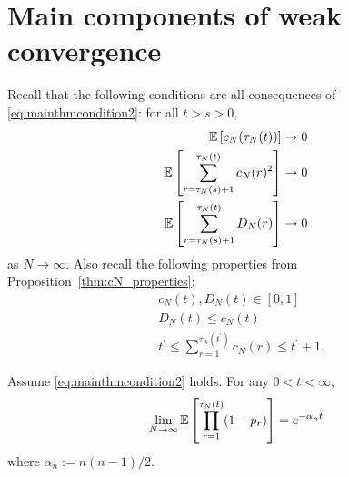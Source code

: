 \section{Main components of weak convergence \seb{$\checkmark$} }
Recall that the following conditions are all consequences of \eqref{eq:mainthmcondition2}: for all $t>s>0$,
\begin{align}
\mathbb{E} \left[ c_N(\tau_N(t)) \right] &\rightarrow 0 \label{eq:BJJK_eq3.3}\\
\mathbb{E}\left[ \sum_{r=\tau_N(s)+1}^{\tau_N(t)} c_N(r)^2 \right] &\rightarrow 0
        \label{eq:BJJK_eq3.5}\\
\mathbb{E}\left[ \sum_{r=\tau_N(s)+1}^{\tau_N(t)} D_N(r) \right] &\rightarrow 0
        \label{eq:BJJK_eq3.4}
\end{align}
as $N\to\infty$.
Also recall the following properties from Proposition~\ref{thm:cN_properties}:
\begin{align}
& c_N(t) , D_N(t) \in [0,1] \label{eq:cN_property1}\\
& D_N(t) \leq c_N(t) \label{eq:cN_property2}\\
& t^\prime
    \leq \sum_{r=1}^{\tau_N(t^\prime)} c_N(r) 
    \leq t^\prime +1 .\label{eq:cN_property4}
\end{align}


\begin{lemma}\label{thm:basis}
Assume \eqref{eq:mainthmcondition2} holds.
For any $0 < t < \infty$,
\begin{equation*}
\lim_{N\to\infty} \mathbb{E}\left[ \prod_{r=1}^{\tau_N(t)} (1-p_r) \right] 
= e^{-\alpha_n t}
\end{equation*}
where $\alpha_n := n(n-1)/2$.
\end{lemma}

